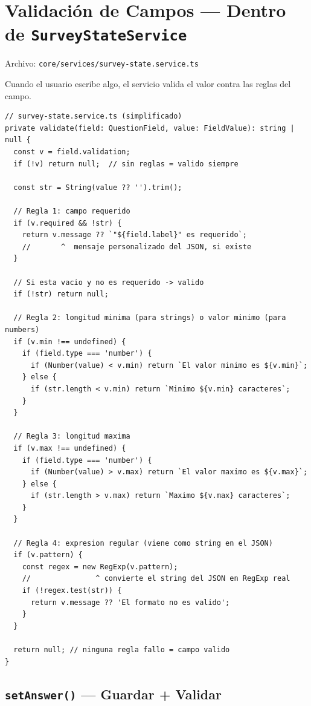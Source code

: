 \documentclass[12pt, a4paper]{article}
\begin{document}
\section{  Validación de Campos --- Dentro de \texttt{SurveyStateService}}

Archivo: \textcolor{morado}{\texttt{core/services/survey-state.service.ts}}

Cuando el usuario escribe algo, el servicio valida el valor contra las reglas del campo.

\begin{lstlisting}
// survey-state.service.ts (simplificado)
private validate(field: QuestionField, value: FieldValue): string | null {
  const v = field.validation;
  if (!v) return null;  // sin reglas = valido siempre

  const str = String(value ?? '').trim();

  // Regla 1: campo requerido
  if (v.required && !str) {
    return v.message ?? `"${field.label}" es requerido`;
    //       ^  mensaje personalizado del JSON, si existe
  }

  // Si esta vacio y no es requerido -> valido
  if (!str) return null;

  // Regla 2: longitud minima (para strings) o valor minimo (para numbers)
  if (v.min !== undefined) {
    if (field.type === 'number') {
      if (Number(value) < v.min) return `El valor minimo es ${v.min}`;
    } else {
      if (str.length < v.min) return `Minimo ${v.min} caracteres`;
    }
  }

  // Regla 3: longitud maxima
  if (v.max !== undefined) {
    if (field.type === 'number') {
      if (Number(value) > v.max) return `El valor maximo es ${v.max}`;
    } else {
      if (str.length > v.max) return `Maximo ${v.max} caracteres`;
    }
  }

  // Regla 4: expresion regular (viene como string en el JSON)
  if (v.pattern) {
    const regex = new RegExp(v.pattern);
    //               ^ convierte el string del JSON en RegExp real
    if (!regex.test(str)) {
      return v.message ?? 'El formato no es valido';
    }
  }

  return null; // ninguna regla fallo = campo valido
}
\end{lstlisting}

\subsection{  \texttt{setAnswer()} --- Guardar + Validar}
\end{document}

